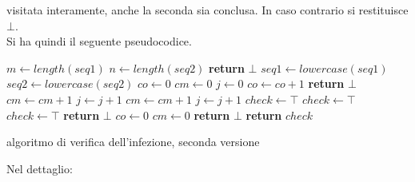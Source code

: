 \documentclass[a4paper,12pt, oneside]{book}
\begin{document}
visitata interamente, anche la seconda sia conclusa. In caso contrario si
restituisce $\bot$.\\
Si ha quindi il seguente pseudocodice.
\begin{algorithm}[H]
  \small
  \begin{algorithmic}[1]
    \State $m \gets length(seq1)$
    \State $n \gets length(seq2)$
    \State \textbf{return} $\bot$
    \EndIf
    \State $seq1\gets lowercase(seq1)$
    \State $seq2\gets lowercase(seq2)$
    \State $co \gets 0$
    \State $cm \gets 0$
    \State $j \gets 0$
    \State $co \gets co+1$
    \State \textbf{return} $\bot$
    \EndIf
    \State $cm \gets cm+1$
    \State $j \gets j+1$
    \EndWhile
    \State $cm \gets cm+1$
    \State $j \gets j+1$
    \State $check \gets \top$
    \State $check \gets \top$
    \State $check \gets \top$
    \Else
    \State  \textbf{return} $\bot$
    \EndIf
    \State $co \gets 0$
    \State $cm \gets 0$
    \State  \textbf{return} $\bot$
    \EndIf
    \EndIf
    \EndFor
    \State \textbf{return} $check$
    \EndFunction
  \end{algorithmic}
  \caption{algoritmo di verifica dell'infezione, seconda versione}
\end{algorithm}
Nel dettaglio:
\end{document}
